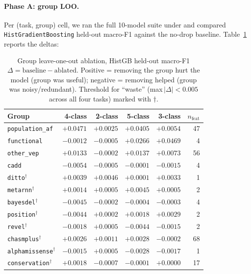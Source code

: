 \documentclass[11pt,a4paper]{article}
\begin{document}
\paragraph{Phase A: group LOO.}
Per (task, group) cell, we ran the full 10-model suite under
 and
compared \texttt{HistGradientBoosting} held-out macro-F1 against the
no-drop baseline. Table~\ref{tab:ablation-headline} reports the deltas:

\begin{table}[H]
\centering
\caption{Group leave-one-out ablation, HistGB held-out macro-F1
$\Delta = \text{baseline} - \text{ablated}$. Positive = removing the
group hurt the model (group was useful); negative = removing helped
(group was noisy/redundant). Threshold for ``waste'' (max\,$|\Delta|<0.005$
across all four tasks) marked with $\dagger$.}
\label{tab:ablation-headline}
\small
\begin{tabular}{lrrrrr}
\toprule
Group & 4-class & 2-class & 5-class & 3-class & $n_{\text{feat}}$ \\
\midrule
\texttt{population\_af} & $+0.0471$ & $+0.0025$ & $+0.0405$ & $+0.0054$ & 47 \\
\texttt{functional} & $-0.0012$ & $-0.0005$ & $+0.0266$ & $+0.0469$ & 4 \\
\texttt{other\_vep} & $+0.0133$ & $-0.0002$ & $+0.0137$ & $+0.0073$ & 56 \\
\texttt{cadd} & $-0.0054$ & $-0.0005$ & $-0.0001$ & $-0.0015$ & 4 \\
\texttt{ditto}$^\dagger$ & $+0.0039$ & $+0.0046$ & $+0.0001$ & $+0.0033$ & 1 \\
\texttt{metarnn}$^\dagger$ & $+0.0014$ & $+0.0005$ & $+0.0045$ & $+0.0005$ & 2 \\
\texttt{bayesdel}$^\dagger$ & $-0.0045$ & $-0.0002$ & $-0.0004$ & $-0.0003$ & 4 \\
\texttt{position}$^\dagger$ & $-0.0044$ & $+0.0002$ & $+0.0018$ & $+0.0029$ & 2 \\
\texttt{revel}$^\dagger$ & $-0.0018$ & $+0.0005$ & $-0.0044$ & $-0.0015$ & 2 \\
\texttt{chasmplus}$^\dagger$ & $+0.0026$ & $+0.0011$ & $+0.0028$ & $-0.0002$ & 68 \\
\texttt{alphamissense}$^\dagger$ & $-0.0015$ & $+0.0005$ & $-0.0028$ & $-0.0017$ & 1 \\
\texttt{conservation}$^\dagger$ & $+0.0018$ & $-0.0007$ & $-0.0001$ & $+0.0000$ & 17 \\
\bottomrule
\end{tabular}
\end{table}
\end{document}
